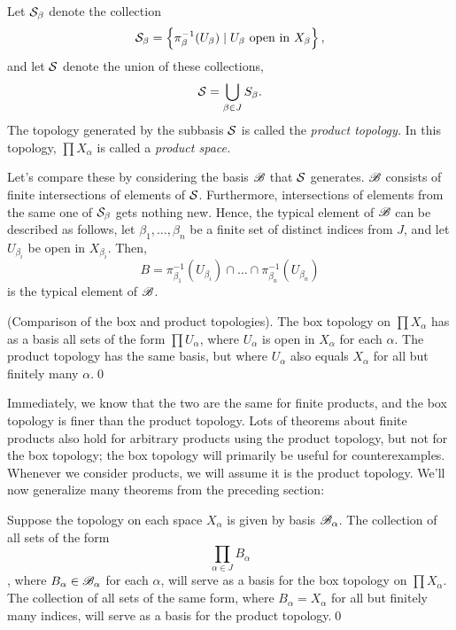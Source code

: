 \documentclass[10pt]{report}
\begin{document}
\begin{definition}
  Let $\mathcal{S}_\beta$ denote the collection
  \[
    \mathcal{S}_\beta = \left\{ \pi_\beta^{-1}(U_\beta) \mid U_\beta \text{ open in } X_\beta  \right\},
  \]
  and let $\mathcal{S}$ denote the union of these collections,
  \[
    \mathcal{S} = \bigcup_{\beta \in J} S_\beta.
  \]
  The topology generated by the subbasis $\mathcal{S}$ is called the \emph{product topology.}
  In this topology, $\prod X_\alpha$ is called a \emph{product space.}
\end{definition}

Let's compare these by considering the basis $\mathscr{B}$ that $\mathcal{S}$ generates.
$\mathscr{B}$ consists of finite intersections of elements of $\mathcal{S}$.
Furthermore, intersections of elements from the same one of $\mathcal{S}_\beta$ gets nothing new.
Hence, the typical element of $\mathscr{B}$ can be described as follows, let $\beta_1,\dots,\beta_n$ be a finite set of distinct indices from $J$, and let $U_{\beta_i}$ be open in $X_{\beta_i}$.
Then,
\[
    B = \pi_{\beta_1}^{-1}(U_{\beta_i}) \cap \dots \cap \pi_{\beta_n}^{-1}(U_{\beta_n})
\]
is the typical element of $\mathscr{B}$.

\begin{theorem}
  {\normalfont (Comparison of the box and product topologies).}
  The box topology on $\prod X_\alpha$ has as a basis all sets of the form $\prod U_\alpha$, where $U_\alpha$ is open in $X_\alpha$ for each $\alpha$.
  The product topology has the same basis, but where $U_\alpha$ also equals $X_\alpha$ for all but finitely many $\alpha$.\qed
\end{theorem}

Immediately, we know that the two are the same for finite products, and the box topology is finer than the product topology.
Lots of theorems about finite products also hold for arbitrary products using the product topology, but not for the box topology; the box topology will primarily be useful for counterexamples.
Whenever we consider products, we will assume it is the product topology.
We'll now generalize many theorems from the preceding section:

\begin{theorem}
  Suppose the topology on each space $X_\alpha$ is given by basis $\mathscr{B}_\alpha$.
  The collection of all sets of the form
  \[ \prod_{\alpha \in J} B_\alpha \],
  where $B_\alpha \in \mathscr{B}_\alpha$ for each $\alpha$, will serve as a basis for the box topology on $\prod X_\alpha$.
  The collection of all sets of the same form, where $B_\alpha = X_\alpha$ for all but finitely many indices, will serve as a basis for the product topology.\qed
\end{theorem}
\end{document}
